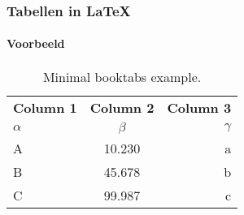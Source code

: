 \documentclass[aspectratio=169]{beamer}
\begin{document}
\begin{frame}
  \frametitle{Tabellen in {\LaTeX}}
  \framesubtitle{Voorbeeld}

  \begin{table}
    \begin{tabular}{lcr}
      \toprule
      \textbf{Column 1} & \textbf{Column 2} & \textbf{Column 3} \\
      $\alpha$          & $\beta$           & $\gamma$          \\
      \midrule
      A                 & 10.230            & a                 \\
      B                 & 45.678            & b                 \\
      C                 & 99.987            & c                 \\
      \bottomrule
    \end{tabular}
    \caption{\label{tab:example}Minimal booktabs example.}
  \end{table}

\end{frame}
\end{document}
